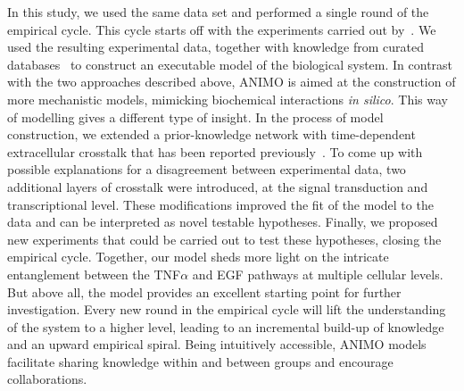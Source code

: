 In this study, we used the same data set and performed a single round of the empirical cycle. This cycle starts off with the experiments carried out by~\citet{pathway-compendium}. We used the resulting experimental data, together with knowledge from curated databases~\citep{kegg,phosphosite} to construct an executable model of the biological system.
In contrast with the two approaches described above, ANIMO is aimed at the construction of
more mechanistic models, mimicking biochemical interactions \emph{in silico}. This way of modelling
gives a different type of insight. In the process of model construction, we extended a
prior-knowledge network with time-dependent extracellular crosstalk that has been reported
previously~\citep{pathway-autocrine}. To come up with possible explanations for a disagreement
between experimental data, two additional layers of
crosstalk were introduced, at the signal transduction and transcriptional level. These modifications 
improved the fit of the model to the data and can be interpreted as novel testable hypotheses.
Finally, we proposed new experiments that could be carried out to test these hypotheses, closing the empirical cycle. 
Together, our model sheds more light on the intricate
entanglement between the TNF$\alpha$ and EGF pathways at multiple cellular levels.
But above all,  the model provides an excellent starting point for further investigation.
Every new round in the empirical cycle will lift the understanding of the system to a higher level, leading to an incremental build-up of knowledge and an upward empirical spiral. Being intuitively accessible, ANIMO models facilitate sharing knowledge within and between groups and encourage collaborations.
